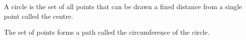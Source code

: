 A circle is the set of all points that can be drawn a fixed distance from a single point called the centre.

The set of points forms a path called the circumference of the circle.